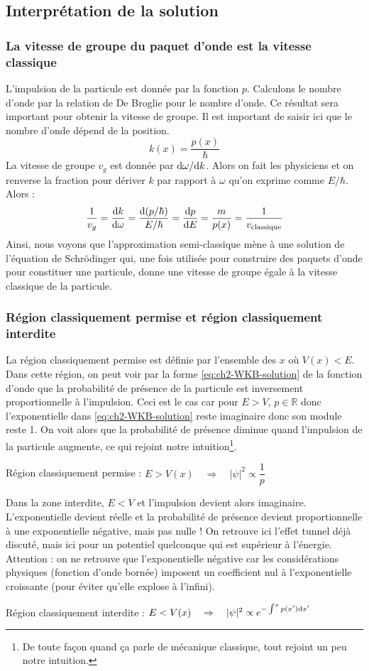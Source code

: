 \subsection{Interprétation de la solution}

\subsubsection{La vitesse de groupe du paquet d'onde est la vitesse classique}
L'impulsion de la particule est donnée par la fonction $p$. Calculons le nombre d'onde par la relation de De Broglie pour le nombre d'onde. Ce résultat sera important pour obtenir la vitesse de groupe. Il est important de saisir ici que le nombre d'onde dépend de la position.
$$k(x) = \dfrac{p(x)}{\hbar}$$
La vitesse de groupe $v_g$ est donnée par $\mathrm{d}\omega/\mathrm{d} k$. Alors on fait les physiciens et on renverse la fraction pour dériver $k$ par rapport à $\omega$ qu'on exprime comme $E/\hbar$. Alors :
$$\dfrac{1}{v_g} = \dfrac{\mathrm{d} k}{\mathrm{d} \omega} = \dfrac{\mathrm{d} (p/\hbar)}{E/\hbar} = \dfrac{\mathrm{d} p }{\mathrm{d} E} = \dfrac{m}{p(x)}=  \dfrac{1}{v_{\text{classique}}}$$
Ainsi, nous voyons que l'approximation semi-classique mène à une solution de l'équation de Schrödinger qui, une fois utilisée pour construire des paquets d'onde pour constituer une particule, donne une vitesse de groupe égale à la vitesse classique de la particule.

\subsubsection{Région classiquement permise et région classiquement interdite}
La région classiquement permise est définie par l'ensemble des $x$ où $V(x) < E$. Dans cette région, on peut voir par la forme \ref{eq:ch2-WKB-solution} de la fonction d'onde que la probabilité de présence de la particule est inversement proportionnelle à l'impulsion. Ceci est le cas car pour $E>V$, $p\in \mathbb{R}$ donc l'exponentielle dans \ref{eq:ch2-WKB-solution} reste imaginaire donc son module reste 1. On voit alors que la probabilité de présence diminue quand l'impulsion de la particule augmente, ce qui rejoint notre intuition\footnote{De toute façon quand ça parle de mécanique classique, tout rejoint un peu notre intuition.}.
\begin{center}
  Région classiquement permise : $E>V(x) \quad \Rightarrow \quad |\psi|^2 \propto \dfrac{1}{p}$
\end{center}

Dans la zone interdite, $E<V$ et l'impulsion devient alors imaginaire. L'exponentielle devient réelle et la probabilité de présence devient proportionnelle à une exponentielle négative, mais pas nulle ! On retrouve ici l'effet tunnel déjà discuté, mais ici pour un potentiel quelconque qui est supérieur à l'énergie. Attention : on ne retrouve que l'exponentielle négative car les considérations physiques (fonction d'onde bornée) imposent un coefficient nul à l'exponentielle croissante (pour éviter qu'elle explose à l'infini).
\begin{center}
  Région classiquement interdite : $E<V(x) \quad \Rightarrow \quad |\psi|^2 \propto e^{-\int ^x p(x') \mathrm{d} x'}$
\end{center}

